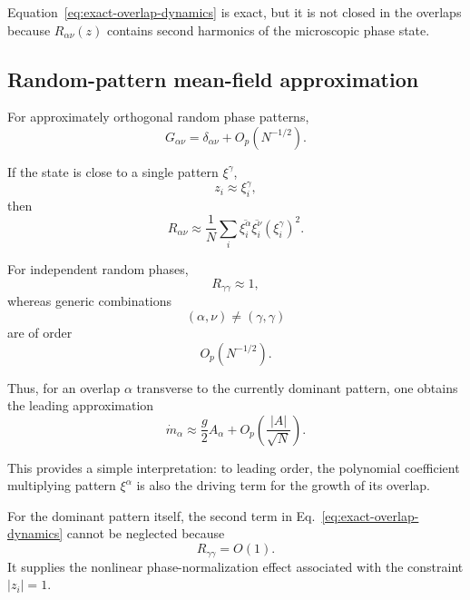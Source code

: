 Equation~\eqref{eq:exact-overlap-dynamics} is exact, but it is not closed in
the overlaps because $R_{\alpha\nu}(z)$ contains second harmonics of the
microscopic phase state.

\subsection{Random-pattern mean-field approximation}

For approximately orthogonal random phase patterns,
\begin{equation}
G_{\alpha\nu}
=
\delta_{\alpha\nu}
+
O_p(N^{-1/2}).
\end{equation}

If the state is close to a single pattern $\xi^\gamma$,
\begin{equation}
z_i
\approx
\xi_i^\gamma,
\end{equation}
then
\begin{equation}
R_{\alpha\nu}
\approx
\frac{1}{N}
\sum_i
\overline{\xi_i^\alpha}
\overline{\xi_i^\nu}
(\xi_i^\gamma)^2.
\end{equation}

For independent random phases,
\begin{equation}
R_{\gamma\gamma}
\approx1,
\end{equation}
whereas generic combinations
\begin{equation}
(\alpha,\nu)\neq(\gamma,\gamma)
\end{equation}
are of order
\begin{equation}
O_p(N^{-1/2}).
\end{equation}

Thus, for an overlap $\alpha$ transverse to the currently dominant pattern,
one obtains the leading approximation
\begin{equation}
\dot m_\alpha
\approx
\frac{g}{2}A_\alpha
+
O_p
\left(
\frac{|A|}{\sqrt N}
\right).
\label{eq:transverse-overlap}
\end{equation}

This provides a simple interpretation: to leading order, the polynomial
coefficient multiplying pattern $\xi^\alpha$ is also the driving term for the
growth of its overlap.

For the dominant pattern itself, the second term in
Eq.~\eqref{eq:exact-overlap-dynamics} cannot be neglected because
\begin{equation}
R_{\gamma\gamma}=O(1).
\end{equation}
It supplies the nonlinear phase-normalization effect associated with the
constraint $|z_i|=1$.

